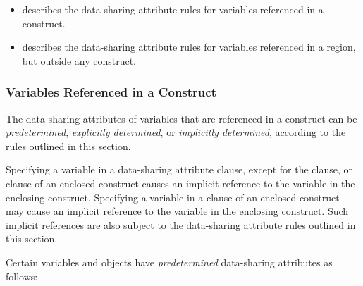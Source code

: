 \begin{itemize}
\item {} describes the 
      data-sharing attribute rules for variables referenced in a construct.
\item {} 
      describes the data-sharing attribute rules for variables referenced in a 
      region, but outside any construct.
\end{itemize}



\subsubsection{Variables Referenced in a Construct}
\label{subsubsec:Variables Referenced in a Construct}
The data-sharing attributes of variables that are referenced in a construct can be
\emph{predetermined}, \emph{explicitly determined}, or \emph{implicitly determined}, 
according to the rules outlined in this section.

Specifying a variable in a data-sharing attribute clause, except for the 
 clause, or  clause of an enclosed construct 
causes an implicit reference to the variable in the enclosing construct. 
Specifying a variable in a  clause of an enclosed construct may 
cause an implicit reference to the variable in the enclosing construct.
Such implicit references are also subject to the data-sharing attribute 
rules outlined in this section.

Certain variables and objects have \emph{predetermined} data-sharing 
attributes as follows:

